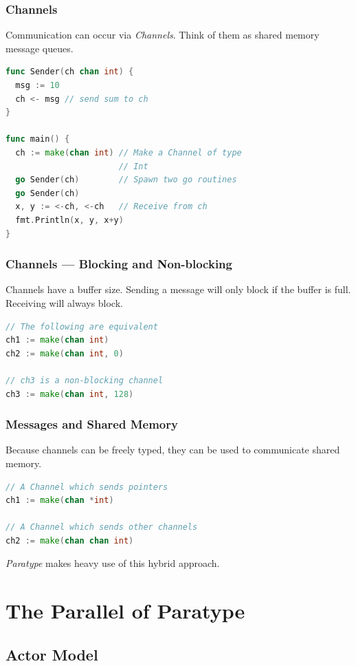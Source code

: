 \documentclass{beamer}
\begin{document}
\begin{frame}[fragile]
  \frametitle{Channels}
  
  Communication can occur via \emph{Channels}. Think of them as shared
  memory message queues.

  \begin{lstlisting}[language=Go]
func Sender(ch chan int) {
  msg := 10 
  ch <- msg // send sum to ch
}

func main() {
  ch := make(chan int) // Make a Channel of type 
                       // Int
  go Sender(ch)        // Spawn two go routines
  go Sender(ch)
  x, y := <-ch, <-ch   // Receive from ch
  fmt.Println(x, y, x+y)
}
  \end{lstlisting}
\end{frame}

\begin{frame}[fragile]
  \frametitle{Channels --- Blocking and Non-blocking}

  Channels have a buffer size. Sending a message will only block if
  the buffer is full. Receiving will always block.
  \begin{lstlisting}[language=Go]
// The following are equivalent
ch1 := make(chan int)
ch2 := make(chan int, 0)

// ch3 is a non-blocking channel
ch3 := make(chan int, 128)
  \end{lstlisting}
\end{frame}

\begin{frame}[fragile]
  \frametitle{Messages and Shared Memory}

  Because channels can be freely typed, they can be used to
  communicate shared memory.

  \begin{lstlisting}[language=Go]
// A Channel which sends pointers
ch1 := make(chan *int)

// A Channel which sends other channels
ch2 := make(chan chan int)
  \end{lstlisting}

\vspace{2em}
\emph{Paratype} makes heavy use of this hybrid approach.
\end{frame}


\section{The Parallel of Paratype}

\subsection{Actor Model}
\end{document}
